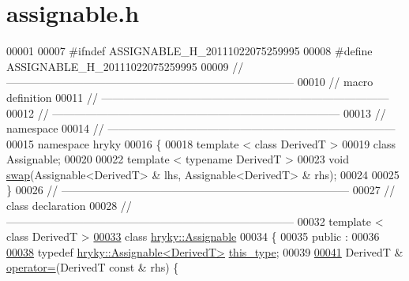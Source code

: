 \hypertarget{assignable_8h_source}{\section{assignable.\-h}
}

\begin{DoxyCode}
00001 
00007 \textcolor{preprocessor}{#ifndef ASSIGNABLE\_H\_20111022075259995}
00008 \textcolor{preprocessor}{}\textcolor{preprocessor}{#define ASSIGNABLE\_H\_20111022075259995}
00009 \textcolor{preprocessor}{}\textcolor{comment}{//
      ------------------------------------------------------------------------------}
00010 \textcolor{comment}{// macro definition}
00011 \textcolor{comment}{//
      ------------------------------------------------------------------------------}
00012 \textcolor{comment}{//
      ------------------------------------------------------------------------------}
00013 \textcolor{comment}{// namespace}
00014 \textcolor{comment}{//
      ------------------------------------------------------------------------------}
00015 \textcolor{keyword}{namespace }hryky
00016 \{
00018     \textcolor{keyword}{template} < \textcolor{keyword}{class} DerivedT >
00019     \textcolor{keyword}{class }Assignable;
00020     
00022     \textcolor{keyword}{template} < \textcolor{keyword}{typename} DerivedT >
00023     \textcolor{keywordtype}{void} \hyperlink{namespacehryky_a4282146df5ea2b68cb667896a2205909}{swap}(Assignable<DerivedT> & lhs, Assignable<DerivedT> & rhs);
00024     
00025 \}
00026 \textcolor{comment}{//
      ------------------------------------------------------------------------------}
00027 \textcolor{comment}{// class declaration}
00028 \textcolor{comment}{//
      ------------------------------------------------------------------------------}
00032 \textcolor{comment}{}\textcolor{keyword}{template} < \textcolor{keyword}{class} DerivedT >
\hypertarget{assignable_8h_source_l00033}{}\hyperlink{classhryky_1_1_assignable}{00033} \textcolor{keyword}{class }\hyperlink{classhryky_1_1_assignable}{hryky::Assignable}
00034 \{
00035 \textcolor{keyword}{public} :
00036 
\hypertarget{assignable_8h_source_l00038}{}\hyperlink{classhryky_1_1_assignable_abcdf8a532564410425753acee1350979}{00038}     \textcolor{keyword}{typedef} \hyperlink{classhryky_1_1_assignable}{hryky::Assignable<DerivedT>} \hyperlink{classhryky_1_1_assignable_abcdf8a532564410425753acee1350979}{this_type};
00039 
\hypertarget{assignable_8h_source_l00041}{}\hyperlink{classhryky_1_1_assignable_a6393258b39e0f8ecbc7acd813d947a1f}{00041}     DerivedT & \hyperlink{classhryky_1_1_assignable_a6393258b39e0f8ecbc7acd813d947a1f}{operator=}(DerivedT \textcolor{keyword}{const} & rhs) \{

\end{DoxyCode}

